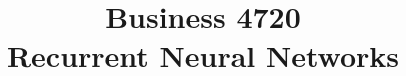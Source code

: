 \documentclass{article}
\title{Business 4720\\ \vspace{\baselineskip}
Recurrent Neural Networks}
\begin{document}
\maketitle

\vfill

\clearpage


\end{document}
